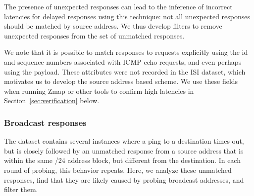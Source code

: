 The presence of unexpected responses can lead to the
inference of incorrect latencies for delayed responses using
this technique: not all unexpected responses should be
matched by source address.
We thus develop filters to remove unexpected responses from the set of
unmatched responses.

We note that it is possible to match responses to requests
explicitly using the id and sequence numbers associated with
ICMP echo requests, and even perhaps using the payload.
These attributes were not recorded in the ISI dataset, which
motivates us to develop the source address based scheme.  We
use these fields when running Zmap or other tools to confirm
high latencies in Section~\ref{sec:verification} below.



% 



\subsubsection{Broadcast responses}

The dataset contains several instances where a ping to a
destination times out, but is closely followed by an
unmatched response from a source address that is within the same /24
address block, but different from the destination.
In each round of probing, this behavior repeats.
%
Here, we analyze these unmatched responses, find that they are likely
caused by probing broadcast addresses, and filter them.

